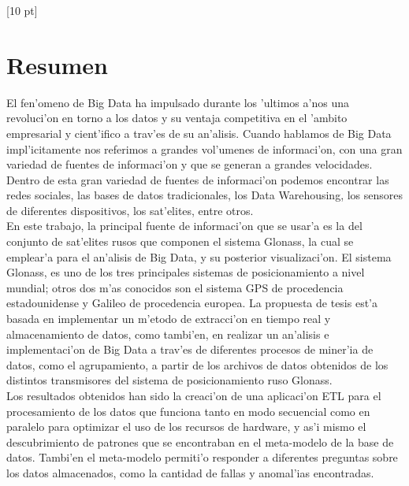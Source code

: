 \titleformat{\chapter}{\Huge\bfseries}{\thechapter}{0 pt}{\rule{340 pt}{3 pt}\\}
\titlespacing{\chapter}{100 pt}{-25 pt}{40 pt}[10 pt]	
\pagestyle{fancy}
\fancyhead[RO,RE]{\thepage}
\fancyfoot[CO,CE]{}

\chapter*{Resumen}


\normalsize
\noindent El fen'omeno de Big Data ha impulsado durante los 'ultimos a'nos una revoluci'on en torno a los datos y su ventaja competitiva en el 'ambito empresarial y cient'ifico a trav'es de su an'alisis.
Cuando hablamos de Big Data impl'icitamente nos referimos a grandes vol'umenes de informaci'on, con una gran variedad de fuentes de informaci'on y que se generan a grandes velocidades.  Dentro de esta gran variedad de fuentes de informaci'on podemos encontrar las redes sociales, las bases de datos tradicionales, los Data Warehousing, los sensores de diferentes dispositivos, los sat'elites, entre otros.\\

En este trabajo, la principal fuente de informaci'on que se usar'a es la del conjunto de sat'elites rusos que componen el sistema Glonass, la cual se emplear'a para el an'alisis de Big Data, y su posterior visualizaci'on. El sistema Glonass, es uno de los tres principales sistemas de posicionamiento a nivel mundial; otros dos m'as conocidos son el sistema GPS de procedencia estadounidense y Galileo de procedencia europea.
La propuesta de tesis est'a basada en implementar un m'etodo de extracci'on en tiempo real y almacenamiento de datos, como tambi'en, en realizar un an'alisis e implementaci'on de Big Data a trav'es de diferentes procesos de miner'ia de datos, como el agrupamiento, a partir de los archivos de datos obtenidos de los distintos transmisores del sistema de posicionamiento ruso Glonass.\\

Los resultados obtenidos han sido la creaci'on de una aplicaci'on ETL para el procesamiento de los datos que funciona tanto en modo secuencial como en paralelo para optimizar el uso de los recursos de hardware, y as'i mismo el descubrimiento de patrones que se encontraban en el meta-modelo de la base de datos. Tambi'en el meta-modelo permiti'o responder a diferentes preguntas sobre los datos almacenados, como la cantidad de fallas y anomal'ias encontradas.

\clearpage